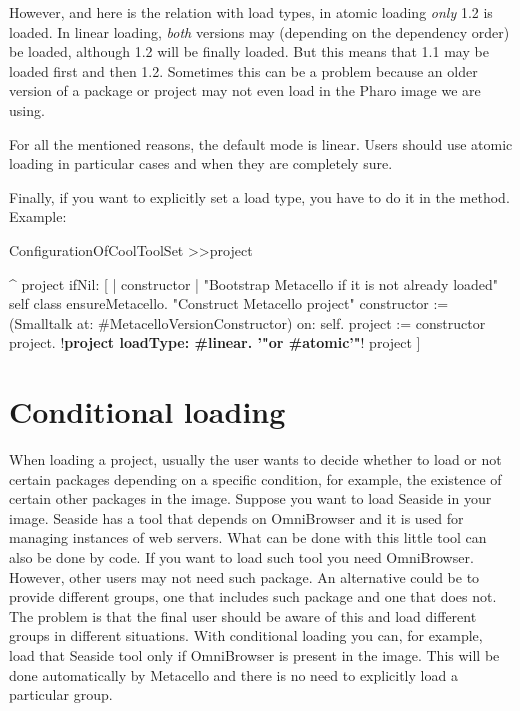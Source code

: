 \documentclass[a4paper,10pt,twoside]{book}
\begin{document}
However, and here is the relation with load types, in atomic loading \emph{only} 1.2 is loaded. In linear loading, \emph{both} versions may (depending on the dependency order) be loaded, although 1.2 will be finally loaded. But this means that 1.1 may be loaded first and then 1.2. Sometimes this can be a problem because an older version of a package or project may not even load in the Pharo image we are using.

For all the mentioned reasons, the default mode is linear. Users should use atomic loading in particular cases and when they are completely sure.

Finally, if you want to explicitly set a load type, you have to do it in the  method. Example:

\begin{code}{}
ConfigurationOfCoolToolSet >>project

       ^ project ifNil: [ | constructor |
              "Bootstrap Metacello if it is not already loaded"
              self class ensureMetacello.
              "Construct Metacello project"
              constructor := (Smalltalk at: #MetacelloVersionConstructor) on: self.
              project := constructor project.
              !\textbf{project loadType: \#linear. '"or \#atomic'"}!
              project ]

\end{code}


\section{Conditional loading}
When loading a project, usually the user wants to decide whether to load or not certain packages depending on a specific condition, for example, the existence of certain other packages in the image. Suppose you want to load Seaside in your image. Seaside has a tool that depends on OmniBrowser and it is used for managing instances of web servers. What can be done with this little tool can also be done by code. If you want to load such tool you need OmniBrowser. However, other users may not need such package. An alternative could be to provide different groups, one that includes such package and one that does not. The problem is that the final user should be aware of this and load different groups in different situations.  With conditional loading you can, for example, load that Seaside tool only if OmniBrowser is present in the image. This will be done automatically by Metacello and there is no need to explicitly load a particular group.
\end{document}
